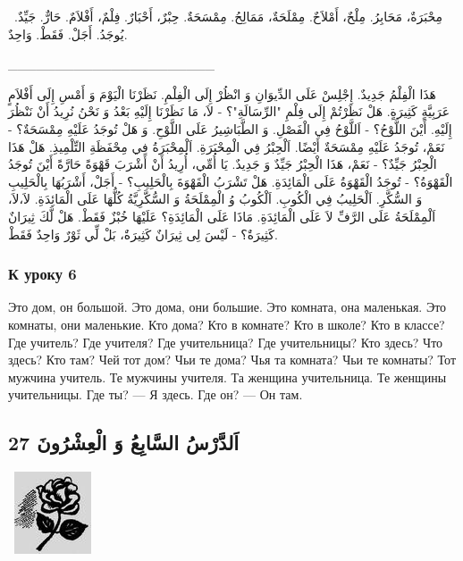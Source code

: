 \documentclass[a5paper]{article}
\begin{document}
\ مِحْبَرَةٌ، مَحَابِرُ. مِلْحٌ، أَمْلاَحٌ. مِمْلَحَةٌ، مَمَالِحُ. مِمْسَحَةٌ. حِبْرٌ، أَحْبَارٌ. فِلْمٌ، أَفْلاَمٌ. حَارٌّ. جَيِّدٌ. يُوجَدُ. أَجَلْ. فَقَطْ. وَاحِدٌ.

\_\_\_\_\_\_\_\_\_\_\_\_\_\_\_\_\_\_\_\_\_\_

هَذَا الْفِلْمُ جَدِيدٌ. إِجْلِسْ عَلَى الدِّيوَانِ وَ انْظُرْ إِلَى الْفِلْمِ. نَظَرْنَا الْيَوْمَ وَ أَمْسِ إِلَى أَفْلاَمٍ عَرَبِيَّةٍ كَثِيرَةٍ. هَلْ نَظَرْتُمْ إِلَى فِلْمِ "الرِّسَالَةِ"؟ - لاَ، مَا نَظَرْنَا إِلَيْهِ بَعْدُ وَ نَحْنُ نُرِيدُ أَنْ نَنْظُرَ إِلَيْهِ. أَيْنَ اللَّوْحُ؟ - اَللَّوْحُ فِي الْفَصْلِ. وَ الطَّبَاشِيرُ عَلَى اللَّوْحِ. وَ هَلْ تُوجَدُ عَلَيْهِ مِمْسَحَةٌ؟ - نَعَمْ، تُوجَدُ عَلَيْهِ مِمْسَحَةٌ أَيْضًا. اَلْحِبْرُ فِي الْمِحْبَرَةِ. اَلْمِحْبَرَةُ فِي مِحْفَظَةِ التِّلْمِيذِ. هَلْ هَذَا الْحِبْرُ جَيِّدٌ؟ - نَعَمْ، هَذَا الْحِبْرُ جَيِّدٌ وَ جَدِيدٌ. يَا أُمِّي، أُرِيدُ أَنْ أَشْرَبَ قَهْوَةً حَارَّةً أَيْنَ تُوجَدُ الْقَهْوَةُ؟ - تُوجَدُ الْقَهْوَةُ عَلَى الْمَائِدَةِ. هَلْ تَشْرَبُ الْقَهْوَةَ بِالْحَلِيبِ؟ - أَجَلْ، أَشْرَبُهَا بِالْحَلِيبِ وَ السُّكَّرِ. اَلْحَلِيبُ فِي الْكُوبِ. اَلْكُوبُ وُ الْمِمْلَحَةُ وَ السُّكَّرِيَّةُ كُلُّهَا عَلَى الْمَائِدَةِ. لاَ،لاَ، اَلْمِمْلَحَةُ عَلَى الرَّفِّ لاَ عَلَى الْمَائِدَةِ. مَاذَا عَلَى الْمَائِدَةِ؟ عَلَيْهَا خُبْزٌ فَقَطْ. هَلْ لَّكَ ثِيرَانٌ كَثِيرَةٌ؟ - لَيْسَ لِى ثِيرَانٌ كَثِيرَةٌ، بَلْ لِّي ثَوْرٌ وَاحِدٌ فَقَطْ.

\subsubsection{К уроку 6}
Это дом, он большой. Это дома, они большие. Это комната, она маленькая. Это комнаты, они маленькие. Кто дома? Кто в комнате? Кто в школе? Кто в классе? Где учитель? Где учителя? Где учительница? Где учительницы? Кто здесь? Что здесь? Кто там? Чей тот дом? Чьи те дома? Чья та комната? Чьи те комнаты? Тот мужчина учитель. Те мужчины учителя. Та женщина учительница. Те женщины учительницы. Где ты? — Я здесь. Где он? — Он там.

\subsection{27 اَلدَّرْسُ السَّابِعُ وَ الْعِشْرُونَ}
\  \includegraphics[width=0.8957in,height=0.9583in]{images/MuhammadBagauddinprettified-img056.jpg} 
\end{document}
